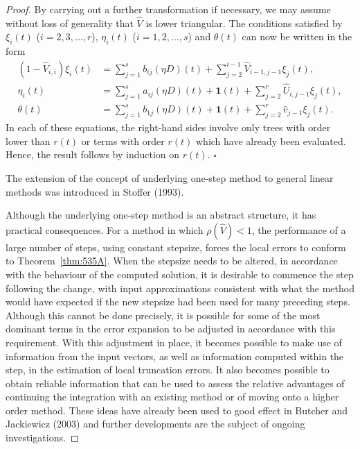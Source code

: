 \begin{proof}
By carrying out a further transformation if necessary, we may assume without loss of generality that $\widehat{V}$ is lower triangular. The conditions satisfied by $\xi_i(t)$ ($i = 2, 3, \dots, r$), $\eta_i(t)$ ($i = 1, 2, \dots, s$) and $\theta(t)$ can now be written in the form
\begin{align*}
(1 - \widehat{V}_{i,i}) \xi_i(t) &= \sum_{j=1}^{s} b_{ij} (\eta D)(t) + \sum_{j=2}^{i-1} \widehat{V}_{i-1,j-1} \xi_j(t), \\
\eta_i(t) &= \sum_{j=1}^{s} a_{ij} (\eta D)(t) + \mathbf{1}(t) + \sum_{j=2}^{r} \widehat{U}_{i,j-1} \xi_j(t), \\
\theta(t) &= \sum_{j=1}^{s} b_{1j} (\eta D)(t) + \mathbf{1}(t) + \sum_{j=2}^{r} \widehat{v}_{j-1} \xi_j(t).
\end{align*}
In each of these equations, the right-hand sides involve only trees with order lower than $r(t)$ or terms with order $r(t)$ which have already been evaluated. Hence, the result follows by induction on $r(t)$. $\square$

The extension of the concept of underlying one-step method to general linear methods was introduced in Stoffer (1993).

Although the underlying one-step method is an abstract structure, it has practical consequences. For a method in which $\rho(\widehat{V}) < 1$, the performance of a large number of steps, using constant stepsize, forces the local errors to conform to Theorem~\ref{thm:535A}. When the stepsize needs to be altered, in accordance with the behaviour of the computed solution, it is desirable to commence the step following the change, with input approximations consistent with what the method would have expected if the new stepsize had been used for many preceding steps. Although this cannot be done precisely, it is possible for some of the most dominant terms in the error expansion to be adjusted in accordance with this requirement. With this adjustment in place, it becomes possible to make use of information from the input vectors, as well as information computed within the step, in the estimation of local truncation errors. It also becomes possible to obtain reliable information that can be used to assess the relative advantages of continuing the integration with an existing method or of moving onto a higher order method. These ideas have already been used to good effect in Butcher and Jackiewicz (2003) and further developments are the subject of ongoing investigations.
\end{proof}

